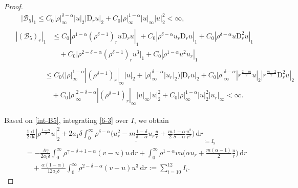 \documentclass[11pt,reqno]{amsart}
\numberwithin{rk}{section}
\numberwithin{prop}{section}
\numberwithin{mydef}{section}
\numberwithin{lem}{section}
\numberwithin{equation}{section}
\numberwithin{thm}{section}
\begin{document}
\begin{proof}
\begin{align*}
&\quad \, |\mathcal{B}_5|_1\leq C_0|\rho|_\infty^{\delta-\alpha}|u|_2 |\mathrm{D}_r u|_2+C_0|\rho|_\infty^{1-\alpha}|u|_\infty|u|_2^2<\infty,\\
&\begin{aligned}
|(\mathcal{B}_5)_r|_1&\leq C_0 |\rho^{1-\alpha}(\rho^{\delta-1})_ru\mathrm{D}_r u|_1+C_0 |\rho^{\delta-\alpha}u_r\mathrm{D}_r u|_1+C_0 |\rho^{\delta-\alpha}u\mathrm{D}_r^2 u|_1\\
&\quad+ C_0\big|\rho^{2-\delta-\alpha}(\rho^{\delta-1})_r u^3\big|_1+C_0|\rho^{1-\alpha}u^2u_r|_1
\end{aligned}\\
&\qquad\quad \ \begin{aligned}
&\leq C_0\big(|\rho|_\infty^{1-\alpha}|(\rho^{\delta-1})_r|_\infty |u|_2+ |\rho|_\infty^{\delta-\alpha}|u_r|_2\big) |\mathrm{D}_r u|_2+C_0|\rho|_\infty^{\delta-\alpha}|r^\frac{2-m}{2}u|_2 |r^\frac{m-2}{2}\mathrm{D}_r^2 u|_2\\
&\quad+ C_0|\rho|_\infty^{2-\delta-\alpha}|(\rho^{\delta-1})_r|_\infty|u|_\infty|u|_2^2+C_0|\rho|_\infty^{1-\alpha}|u|_2^2|u_r|_\infty<\infty.
\end{aligned}
\end{align*}




Based on \eqref{int-B5}, integrating \eqref{6-3} over $I$, we obtain
\begin{equation}\label{6.3'}
\begin{aligned}
&\,\frac{1}{2}\frac{\mathrm{d}}{\mathrm{d}t}|\rho^\frac{1-\alpha}{2}u|_2^2+ \underline{2a_1\delta\int_0^\infty\rho^{\delta-\alpha}\Big(u_r^2-m\frac{1-\delta}{\delta-\alpha}u_r\frac{u}{r}+\frac{m}{2}\frac{1-\alpha}{\delta-\alpha}\frac{u^2}{r^2}\Big)\,\mathrm{d}r}_{:=I_{9}}\\
&=-\frac{A\gamma}{2a_1\delta}\int_0^\infty\rho^{\gamma-\delta+1-\alpha}(v-u)u\,\mathrm{d}r+\int_0^\infty\rho^{1-\alpha}vu\Big(\alpha u_r+\frac{m(\alpha-1)}{2}\frac{u}{r}\Big)\,\mathrm{d}r\\
&\quad+\frac{\alpha(1-\alpha)}{12a_1\delta}\int_0^\infty\rho^{2-\delta-\alpha}(v-u)u^3\,\mathrm{d}r:=\sum_{i=10}^{12}I_i.
\end{aligned}
\end{equation}


\end{proof}
\end{document}

